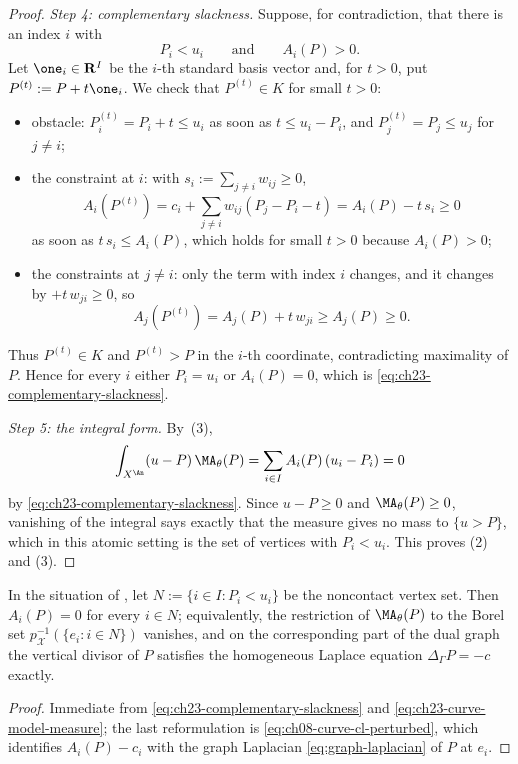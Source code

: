\begin{proof}
\emph{Step 4: complementary slackness.}  Suppose, for contradiction, that
there is an index \(i\) with
\[
 P_i<u_i\qquad\text{and}\qquad A_i(P)>0 .
\]
Let \(\one_i\in\mathbf R^I\) be the \(i\)-th standard basis vector and, for
\(t>0\), put \(P^{(t)}:=P+t\one_i\).  We check that \(P^{(t)}\in K\) for
small \(t>0\):
\begin{itemize}
\item obstacle: \(P^{(t)}_i=P_i+t\leq u_i\) as soon as
\(t\leq u_i-P_i\), and \(P^{(t)}_j=P_j\leq u_j\) for \(j\ne i\);
\item the constraint at \(i\): with
\(s_i:=\sum_{j\ne i}w_{ij}\geq0\),
\[
 A_i(P^{(t)})=c_i+\sum_{j\ne i}w_{ij}(P_j-P_i-t)=A_i(P)-t\,s_i\geq0
\]
as soon as \(t\,s_i\leq A_i(P)\), which holds for small \(t>0\) because
\(A_i(P)>0\);
\item the constraints at \(j\ne i\): only the term with index \(i\) changes,
and it changes by \(+t\,w_{ji}\geq0\), so
\[
 A_j(P^{(t)})=A_j(P)+t\,w_{ji}\geq A_j(P)\geq0 .
\]
\end{itemize}
Thus \(P^{(t)}\in K\) and \(P^{(t)}>P\) in the \(i\)-th coordinate,
contradicting maximality of \(P\).  Hence for every \(i\) either
\(P_i=u_i\) or \(A_i(P)=0\), which is
\eqref{eq:ch23-complementary-slackness}.

\emph{Step 5: the integral form.}  By
\,(3),
\[
 \int_{X^{\An}}(u-P)\,\MA_\theta(P)
 =\sum_{i\in I}A_i(P)\,(u_i-P_i)=0
\]
by \eqref{eq:ch23-complementary-slackness}.  Since \(u-P\geq0\) and
\(\MA_\theta(P)\geq0\), vanishing of the integral says exactly that the
measure gives no mass to \(\{u>P\}\), which in this atomic setting is the
set of vertices with \(P_i<u_i\).  This proves (2) and (3).
\end{proof}

\begin{corollary}
\label{cor:ch23-curve-harmonic-off-contact}
In the situation of , let
\(N:=\{i\in I: P_i<u_i\}\) be the noncontact vertex set.  Then
\(A_i(P)=0\) for every \(i\in N\); equivalently, the restriction of
\(\MA_\theta(P)\) to the Borel set \(p_{\mathcal X}^{-1}(\{e_i:i\in N\})\)
vanishes, and on the corresponding part of the dual graph the vertical
divisor of \(P\) satisfies the homogeneous Laplace equation
\(\Delta_\Gamma P=-c\) exactly.
\end{corollary}

\begin{proof}
Immediate from \eqref{eq:ch23-complementary-slackness} and
\eqref{eq:ch23-curve-model-measure}; the last reformulation is
\eqref{eq:ch08-curve-cl-perturbed}, which identifies \(A_i(P)-c_i\) with
the graph Laplacian \eqref{eq:graph-laplacian} of \(P\) at \(e_i\).
\end{proof}

